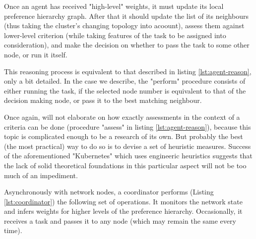 Once an agent has received "high-level" weights, it must update its local preference hierarchy graph.
After that it should update the list of its neighbours (thus taking the cluster's changing topology into acoount), assess them against lower-level criterion (while taking features of the task to be assigned into consideration), and make the decision on whether to pass the task to some other node, or run it itself.

This reasoning process is equivalent to that described in listing \ref{lst:agent-reason}, only a bit detailed.
In the case we describe, the "perform" procedure consists of either running the task, if the selected node number is equivalent to that of the decision making node, or pass it to the best matching neighbour.

Once again, will not elaborate on how exactly assessments in the context of a criteria can be done (procedure "assess" in listing \ref{lst:agent-reason}), because this topic is complicated enough to be a research of its own.
But probably the best (the most practical) way to do so is to devise a set of heuristic measures.
Success of the aforementioned "Kubernetes" which uses engineeric heuristics suggests that the lack of solid theoretical foundations in this particular aspect will not be too much of an impediment.

Asynchronously with network nodes, a coordinator performs (Listing \ref{lst:coordinator}) the following set of operations.
It monitors the network state and infers weights for higher levels of the preference hierarchy.
Occasionally, it receives a task and passes it to any node (which may remain the same every time).
